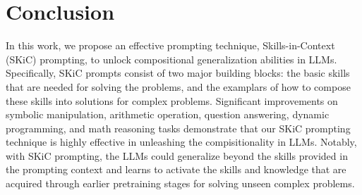 \section{Conclusion}
\label{sec: conclusion}


In this work, we propose an effective prompting technique, Skills-in-Context (SKiC) prompting, to unlock compositional generalization abilities in LLMs. Specifically, SKiC prompts consist of two major building blocks: the basic skills that are needed for solving the problems, and the examplars of how to compose these skills into solutions for complex problems. Significant improvements on symbolic manipulation, arithmetic operation, question answering, dynamic programming, and math reasoning tasks demonstrate that our SKiC prompting technique is highly effective in unleashing the compisitionality in LLMs. Notably, with SKiC prompting, the LLMs could generalize beyond the skills provided in the prompting context and learns to activate the skills and knowledge that are acquired through earlier pretraining stages for solving unseen complex problems.